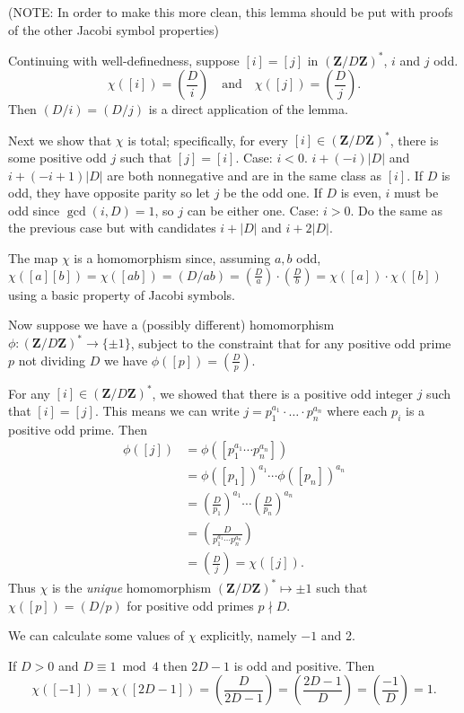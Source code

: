 \documentclass[b5paper,12pt,oneside,openright]{memoir}
\newcommand{\jacobi}[2]{\left(\frac{#1}{#2}\right)}
\begin{document}
(NOTE: In order to make this more clean, this lemma should be put with proofs of the other Jacobi symbol properties)

Continuing with well-definedness, suppose $[i] = [j]$ in $(\mathbf{Z}/D\mathbf{Z})^*$, $i$ and $j$ odd.
\[\chi([i])=\jacobi{D}{i}\quad\text{and}\quad\chi([j])=\jacobi{D}{j}.\] Then $(D/i)=(D/j)$ is a direct application of the lemma.

Next we show that $\chi$ is total; specifically, for every $[i]\in (\mathbf{Z}/D\mathbf{Z})^*$, there is some positive odd $j$ such that $[j] = [i]$.
  Case: $i < 0$. $i+(-i)|D|$ and $i+(-i+1)|D|$ are both nonnegative and are in the same class as $[i]$. If $D$ is odd, they have opposite parity so let $j$ be the odd one. If $D$ is even, $i$ must be odd since $\gcd(i,D)=1$, so $j$ can be either one.
  Case: $i > 0$. Do the same as the previous case but with candidates $i+|D|$ and $i+2|D|$.

The map $\chi$ is a homomorphism since, assuming $a,b$ odd, $\chi([a][b]) = \chi([ab]) = (D/ab) = (\frac{D}{a})\cdot(\frac{D}{b}) = \chi([a])\cdot\chi([b])$ using a basic property of Jacobi symbols.

Now suppose we have a (possibly different) homomorphism
$\phi:(\mathbf{Z}/D\mathbf{Z})^*\to\{\pm 1\}$, subject to the constraint that for any positive odd prime $p$ not dividing $D$ we have
  $\phi([p]) = (\frac{D}{p})$.

For any $[i]\in (\mathbf{Z}/D\mathbf{Z})^*$, we showed that there is a positive odd integer $j$ such that $[i] = [j]$. This means we can write $j=p_1^{a_1}\cdot\ldots\cdot p_n^{a_n}$ where each $p_i$ is a positive odd prime. Then
\begin{align*}
\phi([j]) &= \phi([p_1^{a_1}\cdots p_n^{a_n}])\\
       &= \phi([p_1])^{a_1}\cdots \phi([p_n])^{a_n}\\
       &= \jacobi{D}{p_1}^{a_1}\cdots\jacobi{D}{p_n}^{a_n}\\
       &= \jacobi{D}{p_1^{a_1}\cdots p_n^{a_n}}\\
       &= \jacobi{D}{j} = \chi([j]).
\end{align*}
Thus $\chi$ is the \emph{unique} homomorphism
$(\mathbf{Z}/D\mathbf{Z})^* \mapsto {\pm 1}$
such that $\chi([p]) = (D/p)$ for positive odd primes $p\nmid D$.

We can calculate some values of $\chi$ explicitly, namely $-1$ and 2.

If $D>0$ and $D\equiv 1\bmod 4$ then $2D-1$ is odd and positive. Then
\[\chi([-1])=\chi([2D-1])=\jacobi{D}{2D-1}=\jacobi{2D-1}{D}=\jacobi{-1}{D}=1.\]
\end{document}

